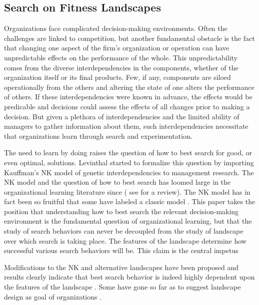 \documentclass[12pt]{article}
\begin{document}
\maketitle

\subsection*{Search on Fitness Landscapes}
Organizations face complicated decision-making environments. Often the challenges are linked to competition, but another fundamental obstacle is the fact that changing one aspect of the firm's organization or operation can have unpredictable effects on the performance of the whole. This unpredictability comes from the diverse interdependencies in the components, whether of the organization itself or its final products. Few, if any, components are siloed operationally from the others and altering the state of one alters the performance of others. If these interdependencies were known in advance, the effects would be predicable and decisions could assess the effects of all changes prior to making a decision. But given a plethora of interdependencies and the limited ability of managers to gather information about them, such interdependencies necessitate that organizations learn through search and experimentation.

The need to learn by doing raises the question of how to best search for good, or even optimal, solutions. Levinthal \citeyearpar{Levinthal1997} started to formalize this question by importing Kauffman's NK model of genetic interdependencies \citep{Kauffman1989} to management research. The NK model and the question of how to best search has loomed large in the organizational learning literature since ( see \cite{Baumann2019} for a review). The NK model has in fact been so fruitful that some have labeled a classic model \cite{Borgonovo2020}. This paper takes the position that understanding how to best search the relevant decision-making environment is the fundamental question of organizational learning, but that the study of search behaviors can never be decoupled from the study of landscape over which search is taking place. The features of the landscape determine how successful various search behaviors will be.
This claim is the central impetus

 Modifications to the NK and alternative landscapes have been proposed and results clearly indicate that best search behavior is indeed highly dependent upon the features of the landscape \cite{Rivkin2007,Winter2007,Callander2011,Rahmandad2019}. Some have gone so far as to suggest landscape design as goal of organizations \cite{Levinthal1999}.
\end{document}
